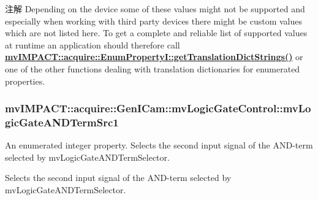 \begin{DoxyNote}{注解}
Depending on the device some of these values might not be supported and especially when working with third party devices there might be custom values which are not listed here. To get a complete and reliable list of supported values at runtime an application should therefore call {\bfseries \hyperlink{classmv_i_m_p_a_c_t_1_1acquire_1_1_enum_property_i_a0ba6ccbf5ee69784d5d0b537924d26b6}{mv\+I\+M\+P\+A\+C\+T\+::acquire\+::\+Enum\+Property\+I\+::get\+Translation\+Dict\+Strings()}} or one of the other functions dealing with translation dictionaries for enumerated properties. 
\end{DoxyNote}
\hypertarget{classmv_i_m_p_a_c_t_1_1acquire_1_1_gen_i_cam_1_1mv_logic_gate_control_a4eb76d114a2504d40b571ab83c4e2b9d}{
\subsubsection[{mv\+Logic\+Gate\+A\+N\+D\+Term\+Src1}]{ mv\+I\+M\+P\+A\+C\+T\+::acquire\+::\+Gen\+I\+Cam\+::mv\+Logic\+Gate\+Control\+::mv\+Logic\+Gate\+A\+N\+D\+Term\+Src1}}\label{classmv_i_m_p_a_c_t_1_1acquire_1_1_gen_i_cam_1_1mv_logic_gate_control_a4eb76d114a2504d40b571ab83c4e2b9d}


An enumerated integer property. Selects the second input signal of the A\+N\+D-\/term selected by mv\+Logic\+Gate\+A\+N\+D\+Term\+Selector. 

Selects the second input signal of the A\+N\+D-\/term selected by mv\+Logic\+Gate\+A\+N\+D\+Term\+Selector.

